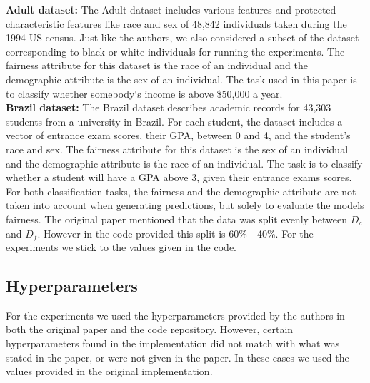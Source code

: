 \textbf{Adult dataset:} The Adult dataset includes various features and protected characteristic features like race and sex of 48,842 individuals taken during the 1994 US census. Just like the authors, we also considered a subset of the dataset corresponding to black or white individuals for running the experiments. The fairness attribute for this dataset is the race of an individual and the demographic attribute is the sex of an individual. The task used in this paper is to classify whether somebody`s income is above \$50,000 a year.\\
\textbf{Brazil dataset:} The Brazil dataset describes academic records for 43,303 students from a university in Brazil. For each student, the dataset includes a vector of entrance exam scores, their GPA, between 0 and 4, and the student’s race and sex. The fairness attribute for this dataset is the sex of an individual and the demographic attribute is the race of an individual. The task is to classify whether a student will have a GPA above 3, given their entrance exams scores.\\

For both classification tasks, the fairness and the demographic attribute are not taken into account when generating predictions, but solely to evaluate the models fairness. The original paper mentioned that the data was split evenly between $D_c$ and $D_f$. However in the code provided this split is 60\% - 40\%. For the experiments we stick to the values given in the code.


\subsection{Hyperparameters}
For the experiments we used the hyperparameters provided by the authors in  both the original paper and the code repository. However, certain hyperparameters found in the implementation did not match with what was stated in the paper, or were not given in the paper. In these cases we used the values provided in the original implementation.

